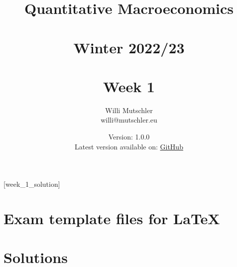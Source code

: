 
\newif\ifDisplaySolutions\DisplaySolutionstrue


\title{Quantitative Macroeconomics\\~\\Winter 2022/23\\~\\Week 1}
\author{Willi Mutschler\\willi@mutschler.eu}
\date{Version: 1.0.0\\Latest version available on: \href{https://github.com/wmutschl/Quantitative-Macroeconomics/releases/latest/download/week_1.pdf}{GitHub}}
\maketitle\thispagestyle{empty}

\newpage
{}[week_1_solution]
\tableofcontents\thispagestyle{empty}\newpage

\setcounter{page}{1}
\newpage
\newpage
\newpage
\newpage
\printbibliography
\newpage
\appendix
\section{Exam template files for \LaTeX}




\ifDisplaySolutions
\newpage
\section{Solutions}

\fi
